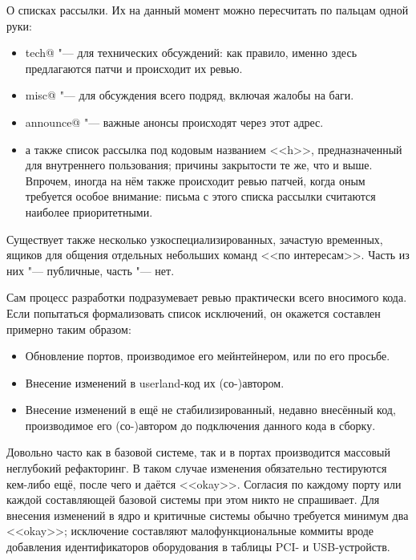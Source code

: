 \documentclass[10pt, a5paper]{article}
\begin{document}
О списках рассылки. Их на данный момент можно пересчитать по пальцам одной руки:
\begin{itemize}
  \item tech@ "--- для технических обсуждений: как правило, именно здесь предлагаются патчи и происходит их ревью.

  \item misc@ "--- для обсуждения всего подряд, включая жалобы на баги.

  \item announce@ "--- важные анонсы происходят через этот адрес.

  \item а также список рассылка под кодовым названием <<h>>, предназначенный для внутреннего пользования; причины закрытости те же, что и выше. Впрочем, иногда на нём также происходит ревью патчей, когда оным требуется особое внимание: письма с этого списка рассылки считаются наиболее приоритетными.
\end{itemize}

Существует также несколько узкоспециализированных, зачастую временных, ящиков для общения отдельных небольших команд <<по интересам>>. Часть из них "--- публичные, часть "--- нет.

Сам процесс разработки подразумевает ревью практически всего вносимого кода. Если попытаться формализовать список исключений, он окажется составлен примерно таким образом:

\begin{itemize}
  \item Обновление портов, производимое его мейнтейнером, или по его просьбе.

  \item Внесение изменений в userland-код их (со-)автором.

  \item Внесение изменений в ещё не стабилизированный, недавно внесённый код, производимое его (со-)автором до подключения данного кода в сборку.
\end{itemize}

Довольно часто как в базовой системе, так и в портах производится массовый неглубокий рефакторинг. В таком случае изменения обязательно тестируются кем-либо ещё, после чего и даётся <<okay>>. Согласия по каждому порту или каждой составляющей базовой системы при этом никто не спрашивает. Для внесения изменений в ядро и критичные системы обычно требуется минимум два <<okay>>; исключение составляют малофункциональные коммиты вроде добавления идентификаторов оборудования в таблицы PCI- и USB-устройств.
\end{document}
